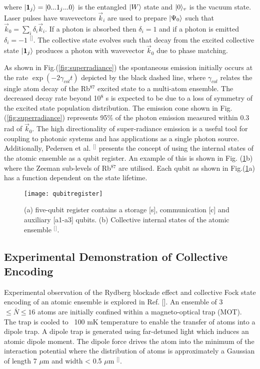 \noindent where $\lvert\textbf{1}_{j}\rangle=\lvert0...1_{j}...0\rangle$ is the entangled $\lvert W\rangle$ state and $\lvert0\rangle_{v}$ is the vacuum state. Laser pulses have wavevectors $\vec{k}_{i}$ are used to prepare $\lvert\Psi_{0}\rangle$ such that $\vec{k}_{0}=\sum_{i} \delta_{i}\vec{k}_{i}$. If a photon is absorbed then $\delta_{i}=1$ and if a photon is emitted $\delta_{i}=-1$ $^{[}$\citep{Nielsen2010QuantumInformation}$^{]}$. The collective state evolves such that decay from the excited collective state $\lvert\textbf{1}_{j}\rangle$ produces a photon with wavevector $\vec{k}_{0}$ due to phase matching. 


As shown in Fig.(\ref{fig:superradiance}) the spontaneous emission initially occurs at the rate $\exp(-2\gamma_{col}t)$ depicted by the black dashed line, where $\gamma_{col}$ relates the single atom decay of the Rb$^{87}$ excited state to a multi-atom ensemble. The decreased decay rate beyond 10$^{8}$ s is expected to be due to a loss of symmetry of the excited state population distribution. The emission cone shown in Fig. (\ref{fig:superradiance}) represents 95\% of the photon emission measured within 0.3 rad of $\vec{k}_{0}$. The high directionality of super-radiance emission is a useful tool for coupling to photonic systems and has applications as a single photon source. Additionally, Pedersen et al. $^{[}$\citep{Pedersen2009FewEncoding}$^{]}$ presents the concept of using the internal states of the atomic ensemble as a qubit register. An example of this is shown in Fig. (\ref{fig:qubitregister}b) where the Zeeman sub-levels of Rb$^{87}$ are utilised. Each qubit as shown in Fig.(\ref{fig:qubitregister}a) has a function dependent on the state lifetime. 


\begin{figure}[t]
\centering
\texttt{[image: qubitregister]}
\caption{\label{fig:qubitregister} (a) five-qubit register contains a storage [s], communication [c] and auxiliary [a1-a3] qubits. (b) Collective internal states of the atomic ensemble $^{[}$\citep{Pedersen2009FewEncoding}$^{]}$.}
\end{figure}



\subsection{\label{subsec:level2}Experimental Demonstration of Collective Encoding}

Experimental observation of the Rydberg blockade effect and collective Fock state encoding of an atomic ensemble is explored in Ref. []. An ensemble of 3 $\leq \bar{N} \leq 16$ atoms are initially confined within a magneto-optical trap (MOT). The trap is cooled to ~100 mK temperature to enable the transfer of atoms into a dipole trap. A dipole trap is generated using far-detuned light which induces an atomic dipole moment. The dipole force drives the atom into the minimum of the interaction potential where the distribution of atoms is approximately a Gaussian of length 7 $\mu$m and width < 0.5 $\mu$m $^{[}$\citep{Grimm2000OpticalAtoms,Ebert2014AtomicBlockade}$^{]}$. 

